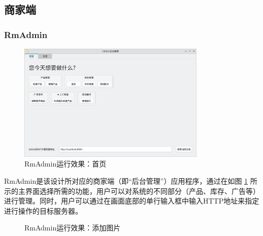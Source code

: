 \subsection{商家端}

\subsubsection{RmAdmin}

\begin{figure}[htbp]
	\centering
	\includegraphics[width=0.8\textwidth]{./exp/rma-index.png}
	\caption{RmAdmin运行效果：首页}
	\label{fig:rma-index}
\end{figure}

RmAdmin是该设计所对应的商家端（即“后台管理”）应用程序，通过在如图 \ref{fig:rma-index} 所示的主界面选择所需的功能，用户可以对系统的不同部分（产品、库存、广告等）进行管理。同时，用户可以通过在画面底部的单行输入框中输入HTTP地址来指定进行操作的目标服务器。

\begin{figure}[htbp]
    \hfill
	\caption{RmAdmin运行效果：添加图片}
	\label{fig:rma-im-add}
\end{figure}

